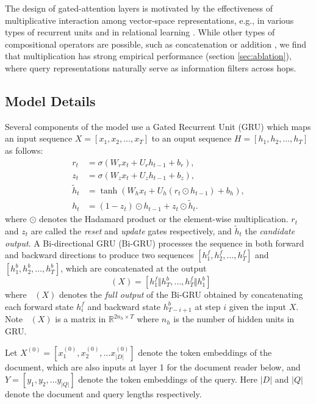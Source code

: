 \documentclass[11pt,a4paper]{article}
\DeclareMathOperator{\bigru}{\overset{\longleftrightarrow}{\mathrm{GRU}}}
\begin{document}
The design of gated-attention layers is motivated by the effectiveness of multiplicative interaction
among vector-space representations,
e.g., in various types of recurrent units \citep{hochreiter1997long, wu2016multiplicative} and in relational learning \citep{yang2014learning, kiros2014multiplicative}.
While other types of compositional operators are possible,
such as concatenation or addition \citep{mitchell2008vector},
we find that multiplication has strong empirical performance
(section \ref{sec:ablation}),
where query representations naturally serve as information filters
across hops.

\subsection{Model Details}
\label{sec:model-details}
Several components of the model use a Gated Recurrent Unit (GRU) \citep{cho2014learning} which maps an input sequence $X = [x_1,x_2,\ldots,x_T]$ to an ouput sequence $H=[h_1,h_2,\ldots,h_T]$ as follows:
\begin{align*}
r_t &= \sigma (W_r x_t + U_r h_{t-1} + b_r), \\
z_t &= \sigma (W_z x_t + U_z h_{t-1} + b_z), \\
\tilde{h}_t &= \tanh(W_h x_t + U_h (r_t \odot h_{t-1}) + b_h), \\
h_t &= (1-z_t) \odot h_{t-1} + z_t \odot \tilde{h}_t.
\end{align*}
where $\odot$ denotes the Hadamard product or the element-wise multiplication.
$r_t$ and $z_t$ are called the \textit{reset} and \textit{update} gates respectively, and $\tilde{h}_t$ the \textit{candidate output}. 
A Bi-directional GRU (Bi-GRU) processes the sequence in both forward and backward directions to produce two sequences $[h_1^f, h_2^f, \dots, h_T^f ]$ and $[ h_1^b, h_2^b, \dots, h_T^b ]$, which are concatenated at the output
\begin{equation}
    \bigru(X) = [h^f_1 \Vert h^b_T,\ldots,h^f_T \Vert h^b_1]
\end{equation}
where $\bigru(X)$ denotes the \textit{full output} of the Bi-GRU obtained by concatenating each forward state $h^f_i$ and backward state $h^b_{T-i+1}$ at step $i$ given the input $X$. Note $\bigru(X)$ is a matrix in $\mathbb{R}^{2n_h \times T}$ where $n_h$ is the number of hidden units in GRU.

Let $X^{(0)} = [x_1^{(0)},x_2^{(0)},\ldots x_{|D|}^{(0)}]$ denote the token embeddings of the document, which are also inputs at layer 1 for the document reader below, and $Y = [y_1,y_2,\ldots y_{|Q|}]$ denote the token embeddings of the query. Here $|D|$ and $|Q|$ denote the document and query lengths respectively.
\end{document}
